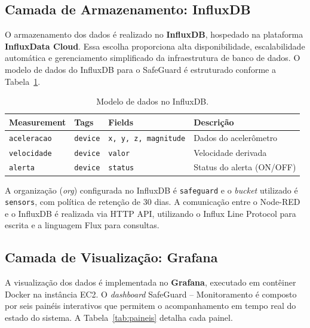 \documentclass[a4paper,12pt]{article}
\begin{document}
\subsection{Camada de Armazenamento: InfluxDB}

O armazenamento dos dados é realizado no \textbf{InfluxDB}, hospedado na plataforma \textbf{InfluxData Cloud}. Essa escolha proporciona alta disponibilidade, escalabilidade automática e gerenciamento simplificado da infraestrutura de banco de dados. O modelo de dados do InfluxDB para o SafeGuard é estruturado conforme a Tabela~\ref{tab:modelo-dados}.

\begin{table}[H]
\centering
\caption{Modelo de dados no InfluxDB.}
\label{tab:modelo-dados}
\begin{tabular}{llll}
\toprule
\textbf{Measurement} & \textbf{Tags} & \textbf{Fields} & \textbf{Descrição} \\
\midrule
\texttt{aceleracao} & \texttt{device} & \texttt{x, y, z, magnitude} & Dados do acelerômetro \\
\texttt{velocidade} & \texttt{device} & \texttt{valor} & Velocidade derivada \\
\texttt{alerta} & \texttt{device} & \texttt{status} & Status do alerta (ON/OFF) \\
\bottomrule
\end{tabular}
\end{table}

A organização (\textit{org}) configurada no InfluxDB é \texttt{safeguard} e o \textit{bucket} utilizado é \texttt{sensors}, com política de retenção de 30 dias. A comunicação entre o Node-RED e o InfluxDB é realizada via HTTP API, utilizando o Influx Line Protocol para escrita e a linguagem Flux para consultas.

\subsection{Camada de Visualização: Grafana}

A visualização dos dados é implementada no \textbf{Grafana}, executado em contêiner Docker na instância EC2. O \textit{dashboard} SafeGuard -- Monitoramento é composto por seis painéis interativos que permitem o acompanhamento em tempo real do estado do sistema. A Tabela~\ref{tab:paineis} detalha cada painel.
\end{document}

